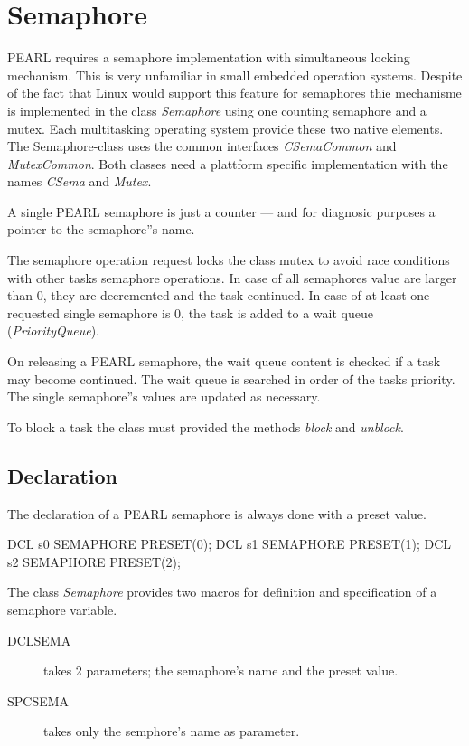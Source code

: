 \chapter{Semaphore}
PEARL requires a semaphore implementation with simultaneous locking
mechanism. This is very unfamiliar in small embedded operation systems.
Despite of the fact that Linux would support this feature for semaphores 
thie mechanisme is implemented in the class {\em Semaphore} using one counting semaphore and a mutex. 
Each multitasking operating system provide these two native elements.
The Semaphore-class uses the common interfaces {\em CSemaCommon} and 
{\em MutexCommon}. Both classes need a plattform specific implementation 
with the names {\em CSema} and {\em Mutex}.

A single PEARL semaphore is
just a counter --- and for diagnosic purposes a pointer to the semaphore''s
name.

The semaphore operation request locks the class mutex to avoid race conditions 
with other tasks semaphore operations. In case of all semaphores value are 
larger than 0, they are decremented and the task continued.
In case of at least one requested single semaphore is 0, the task is added
to a wait queue ({\em PriorityQueue}).

On releasing a PEARL semaphore, the wait queue content is checked if a 
task may become continued. The wait queue is searched in order of the tasks 
priority. The single semaphore''s  values are updated as necessary.

To block a task the class must provided the methods {\em block} and 
{\em unblock}.

\section{Declaration}
The declaration of a PEARL semaphore is always done with a preset value.

\begin{PEARLCode}
DCL s0 SEMAPHORE PRESET(0);
DCL s1 SEMAPHORE PRESET(1);
DCL s2 SEMAPHORE PRESET(2);
\end{PEARLCode}

The class {\em Semaphore} provides two macros for definition and 
specification of a semaphore variable.
\begin{description}
\item[DCLSEMA] takes 2 parameters; the semaphore's name and the preset value.
\item[SPCSEMA] takes only  the semphore's name as parameter.
\end{description}

